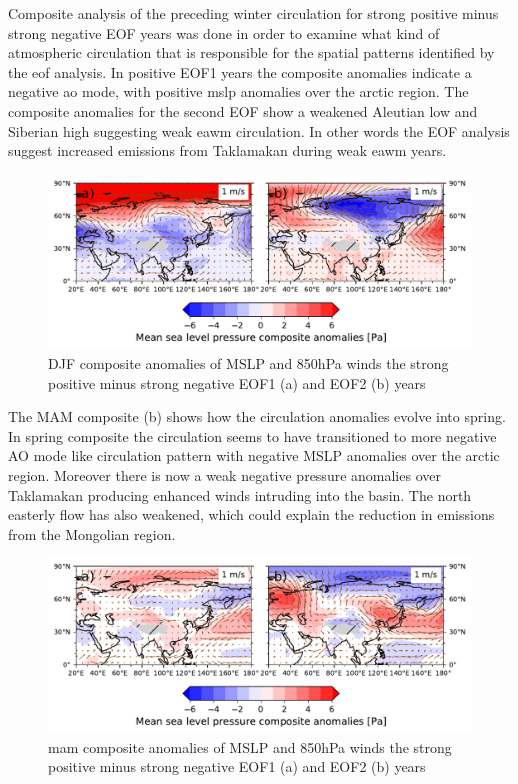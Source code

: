 Composite analysis of the preceding winter circulation for strong positive minus strong negative EOF years was done in order to examine what kind of atmospheric circulation that is responsible for the spatial patterns identified by the \acrshort{eof} analysis. In positive EOF1 years the composite anomalies indicate a negative \acrshort{ao} mode, with positive \acrshort{mslp} anomalies over the arctic region. The composite anomalies for the second EOF show a weakened Aleutian low and Siberian high suggesting weak \acrshort{eawm} circulation. In other words the EOF analysis suggest increased emissions from Taklamakan during weak \acrshort{eawm} years.     
\begin{figure}[htpb]
    \centering
    \includegraphics[width=\textwidth]{texfiles/figs/EOF_emissions_composite.pdf}
    \caption{DJF composite anomalies of MSLP and 850hPa winds the strong positive minus strong negative  EOF1 (a) and EOF2 (b) years}
    \label{fig:eof_composite_DJF}
\end{figure}
The MAM composite (b) shows how the circulation anomalies evolve into spring. In spring composite the circulation seems to have transitioned to more negative AO mode like circulation pattern with negative MSLP anomalies over the arctic region. Moreover there is now a weak negative pressure anomalies over Taklamakan producing enhanced winds intruding into the basin. The north easterly flow has also weakened, which could explain the reduction in emissions from the Mongolian region. 
\begin{figure}[htpb]
    \centering
    \includegraphics[width=\textwidth]{texfiles/figs/EOF_emissions_composite_MAM.pdf}
    \caption{\acrshort{mam} composite anomalies of MSLP and 850hPa winds the strong positive minus strong negative  EOF1 (a) and EOF2 (b) years}
    \label{fig:eof_composite_MAM}
\end{figure}

